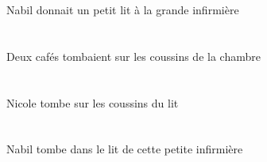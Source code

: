 \begin{exe}
 Nabil donnait un petit lit à la grande infirmière
\ex\glll
   \INDDuAbs{}   \cafeCDuAbs{}    \DEFPlObl{}    \DEFSgObl{}   \chambreBSgObl{}   \DE{}   \coussinBPlObl{}   \SUR{}  \tomberViPstCDu{} \\
   \INDDuAbsP{}   \cafeCDuAbsP{}    \DEFPlOblP{}    \DEFSgOblP{}   \chambreBSgOblP{}   \DEP{}   \coussinBPlOblP{}   \SURP{}  \tomberViPstCDuP{} \\
   \INDDuAbsG{}   \cafeCDuAbsG{}    \DEFPlOblG{}    \DEFSgOblG{}   \chambreBSgOblG{}   \DEG{}   \coussinBPlOblG{}   \SURG{}  \tomberViPstCDuG{} \\
 Deux cafés tombaient sur les coussins de la chambre
\ex\glll
   \INDSgAbs{}   \NicoleBSgAbs{}    \DEFPlObl{}    \DEFSgObl{}   \litDSgObl{}   \DE{}   \coussinBPlObl{}   \SUR{}  \tomberViPrsBSg{} \\
   \INDSgAbsP{}   \NicoleBSgAbsP{}    \DEFPlOblP{}    \DEFSgOblP{}   \litDSgOblP{}   \DEP{}   \coussinBPlOblP{}   \SURP{}  \tomberViPrsBSgP{} \\
   \INDSgAbsG{}   \NicoleBSgAbsG{}    \DEFPlOblG{}    \DEFSgOblG{}   \litDSgOblG{}   \DEG{}   \coussinBPlOblG{}   \SURG{}  \tomberViPrsBSgG{} \\
 Nicole tombe sur les coussins du lit
\ex\glll
   \INDSgAbs{}   \NabilDSgAbs{}    \DEFSgObl{}    \DEMSgObl{}   \petitASg{}   \infirmiereASgObl{}   \DE{}   \litDSgObl{}   \DANS{}  \tomberViPrsDSg{} \\
   \INDSgAbsP{}   \NabilDSgAbsP{}    \DEFSgOblP{}    \DEMSgOblP{}   \petitASgP{}   \infirmiereASgOblP{}   \DEP{}   \litDSgOblP{}   \DANSP{}  \tomberViPrsDSgP{} \\
   \INDSgAbsG{}   \NabilDSgAbsG{}    \DEFSgOblG{}    \DEMSgOblG{}   \petitASgG{}   \infirmiereASgOblG{}   \DEG{}   \litDSgOblG{}   \DANSG{}  \tomberViPrsDSgG{} \\
 Nabil tombe dans le lit de cette petite infirmière
\ex\glll
   \DEFSgAbs{}    \INDSgObl{}   \NicoleBSgObl{}   \DE{}   \filleCSgAbs{}    \DEFSgObl{}    \INDSgObl{}   \NabilDSgObl{}   \DE{}   \chambreBSgObl{}   \DANS{}  \dormirViPrsCSg{} \\
   \DEFSgAbsP{}    \INDSgOblP{}   \NicoleBSgOblP{}   \DEP{}   \filleCSgAbsP{}    \DEFSgOblP{}    \INDSgOblP{}   \NabilDSgOblP{}   \DEP{}   \chambreBSgOblP{}   \DANSP{}  \dormirViPrsCSgP{} \\
   \DEFSgAbsG{}    \INDSgOblG{}   \NicoleBSgOblG{}   \DEG{}   \filleCSgAbsG{}    \DEFSgOblG{}    \INDSgOblG{}   \NabilDSgOblG{}   \DEG{}   \chambreBSgOblG{}   \DANSG{}  \dormirViPrsCSgG{} \\

\end{exe}
